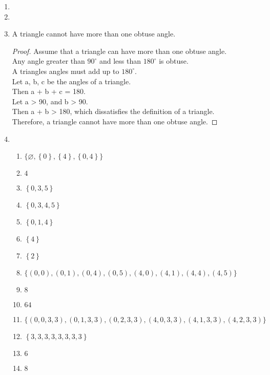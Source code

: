 \begin{enumerate}[leftmargin=2cm,labelsep=.5cm,label=\bf\arabic*.]
\item


\item

\item
\begin{lemma}
A triangle cannot have more than one obtuse angle.
\end{lemma}
\begin{proof}
Assume that a triangle can have more than one obtuse angle.\\
Any angle greater than $90^{\circ}$ and less than $180^{\circ}$ is obtuse.\\
A triangles angles must add up to $180^{\circ}$.\\[2mm]
Let a, b, c be the angles of a triangle.\\
Then a + b + c = 180.\\
Let a > 90, and b > 90.\\[2mm]
Then a + b > 180, which dissatisfies the definition of a triangle.\\
Therefore, a triangle cannot have more than one obtuse angle.
\end{proof}

\item
\begin{enumerate}
  \item $\big\{\varnothing,\left\{0\right\},\left\{4\right\},\left\{0,4\right\} \big\}$
  \item $4$
  \item $\left\{0,3,5 \right\}$
  \item $\left\{0,3,4,5 \right\}$
  \item $\left\{0,1,4 \right\}$
  \item $\left\{4 \right\}$
  \item $\left\{2 \right\}$
  \item $\big\{\left(0,0\right),\left(0,1\right),\left(0,4\right),\left(0,5\right),\left(4,0\right),\left(4,1\right),\left(4,4\right),\left(4,5\right) \big\}$
  \item $8$
  \item $64$
  \item $\big\{\left(0,0,3,3\right),\left(0,1,3,3\right),\left(0,2,3,3\right),\left(4,0,3,3\right),\left(4,1,3,3\right),\left(4,2,3,3\right) \big\}$
  \item $\left\{3,3,3,3,3,3,3,3 \right\}$
  \item $6$
  \item $8$\\[5mm]
\end{enumerate}


\end{enumerate}
